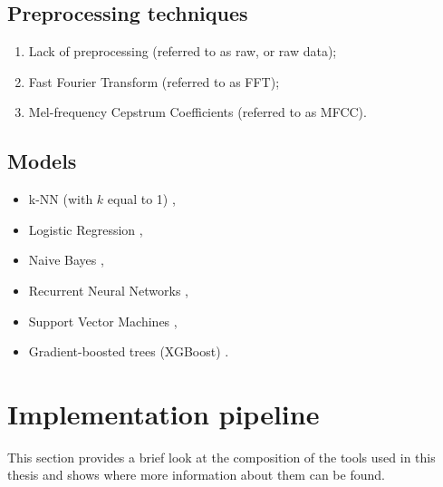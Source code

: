 \documentclass[../main.tex]{subfiles}
\begin{document}
\subsection*{Preprocessing techniques}
\begin{enumerate}
    \item Lack of preprocessing (referred to as raw, or raw data);
    \item Fast Fourier Transform \cite{og2004, skype2019} (referred to as FFT);
    \item Mel-frequency Cepstrum Coefficients \cite{skype2019} (referred to as MFCC).
\end{enumerate}
\subsection*{Models}
\begin{multicols}{2}
    \begin{itemize}
        \item k-NN (with $k$ equal to 1) \cite{content_reconstruction_2014},
        \item Logistic Regression \cite{skype2017},
        \item Naive Bayes \cite{wavelet2022, enigma2015},
        \item Recurrent Neural Networks \cite{slater2019robust},
        \item Support Vector Machines \cite{wavelet2022, skype2017, skype2019},
        \item Gradient-boosted trees (XGBoost) \cite{wavelet2022}.   
    \end{itemize}
\end{multicols}


\section{Implementation pipeline}
\label{sec:intro_implementation_pipeline}
This section provides a brief look at the composition of the tools used in this thesis and shows where more information about them can be found. 
\end{document}
